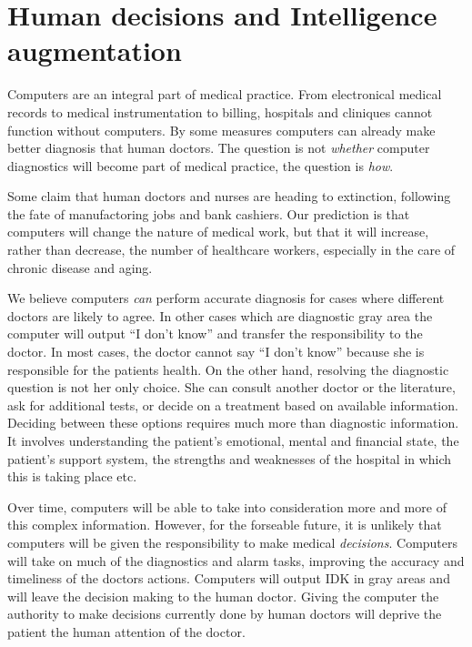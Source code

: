 \documentclass[9pt,twocolumn,twoside]{pnas-new}
\begin{document}
  \section*{Human decisions and Intelligence augmentation}

  Computers are an integral part of medical practice. From
  electronical medical records to medical instrumentation to billing,
  hospitals and cliniques cannot function without computers. By some
  measures computers can already make better diagnosis that human
  doctors. The question is not {\em whether} computer diagnostics will
  become part of medical practice, the question is {\em how}.

  Some claim that human doctors and nurses are heading to extinction,
  following the fate of manufactoring jobs and bank cashiers.  Our prediction is
  that computers will change the nature of medical work, but that it
  will increase, rather than decrease, the number of healthcare
  workers, especially in the care of chronic disease and aging.

  We believe computers {\em can} perform accurate diagnosis for cases where
  different doctors are likely to agree. In other cases which are
  diagnostic gray area the computer will output ``I don't know'' and
  transfer the responsibility to the doctor. In most cases, the doctor
  cannot say ``I don't know'' because she is responsible for the
  patients health. On the other hand, resolving the diagnostic
  question is not her only choice. She can consult another doctor or
  the literature, ask for additional tests, or decide on a treatment
  based on available information. Deciding between these options requires much
  more than diagnostic information. It involves understanding the
  patient's emotional, mental and financial state, the patient's
  support system, the strengths and weaknesses of the hospital in
  which this is taking place etc.

  Over time, computers will be able to take into consideration more
  and more of this complex information. However, for the forseable
  future, it is unlikely that computers will be given the
  responsibility to make medical {\em decisions}. Computers
  will take on much of the diagnostics and alarm tasks, improving the
  accuracy and timeliness of the doctors actions. Computers will
  output IDK in gray areas and will leave the decision making to the
  human doctor. Giving the computer the authority to make decisions
  currently done by human doctors will deprive the patient the human
  attention of the doctor.
\end{document}
